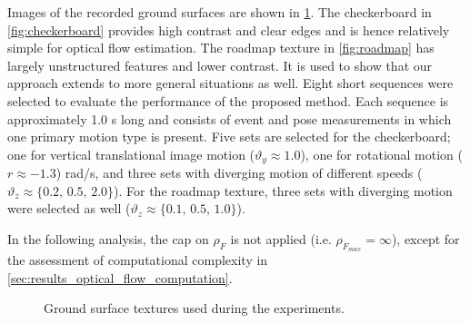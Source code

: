 Images of the recorded ground surfaces are shown in \cref{fig:textures}. The checkerboard in \cref{fig:checkerboard} provides high contrast and clear edges and is hence relatively simple for optical flow estimation. The roadmap texture in \cref{fig:roadmap} has largely unstructured features and lower contrast. It is used to show that our approach extends to more general situations as well. 
Eight short sequences were selected to evaluate the performance of the proposed method. Each sequence is approximately 1.0 s long and consists of event and pose measurements in which one primary motion type is present. Five sets are selected for the checkerboard; one for vertical translational image motion ($\vartheta_y \approx 1.0$), one for rotational motion ($r\approx-1.3$) rad/s, and three sets with diverging motion of different speeds ($\vartheta_z \approx \lbrace0.2,\,0.5,\,2.0\rbrace$). For the roadmap texture, three sets with diverging motion were selected as well ($\vartheta_z \approx \lbrace0.1,\,0.5,\,1.0\rbrace$). 

In the following analysis, the cap on $\rho_F$ is not applied (i.e. $\rho_{F_{max}}=\infty$), except for the assessment of computational complexity in \cref{sec:results_optical_flow_computation}.


\begin{figure}[!ht]
	\centering
	\caption{Ground surface textures used during the experiments.}
	\label{fig:textures}
\end{figure}

%
%

